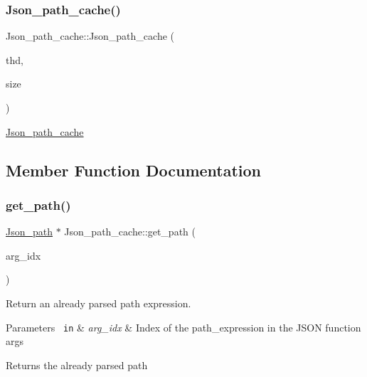 \subsubsection{\texorpdfstring{Json\+\_\+path\+\_\+cache()}{Json\_path\_cache()}}
{\footnotesize\ttfamily Json\+\_\+path\+\_\+cache\+::\+Json\+\_\+path\+\_\+cache (\begin{DoxyParamCaption}\item[{T\+HD $\ast$}]{thd,  }\item[{uint}]{size }\end{DoxyParamCaption})}

\mbox{\hyperlink{classJson__path__cache}{Json\+\_\+path\+\_\+cache}} 

\subsection{Member Function Documentation}
\mbox{\label{classJson__path__cache_ab4e16c6759d543643eee5fdb2abb8eef}} 
\subsubsection{\texorpdfstring{get\+\_\+path()}{get\_path()}}
{\footnotesize\ttfamily \mbox{\hyperlink{classJson__path}{Json\+\_\+path}} $\ast$ Json\+\_\+path\+\_\+cache\+::get\+\_\+path (\begin{DoxyParamCaption}\item[{uint}]{arg\+\_\+idx }\end{DoxyParamCaption})}

Return an already parsed path expression.


\begin{DoxyParams}[1]{Parameters}
\mbox{\texttt{ in}}  & {\em arg\+\_\+idx} & Index of the path\+\_\+expression in the J\+S\+ON function args\\
\hline
\end{DoxyParams}
\begin{DoxyReturn}{Returns}
the already parsed path 
\end{DoxyReturn}
\mbox{\label{classJson__path__cache_acbd772d2719861bc690199d212a36d43}} 
